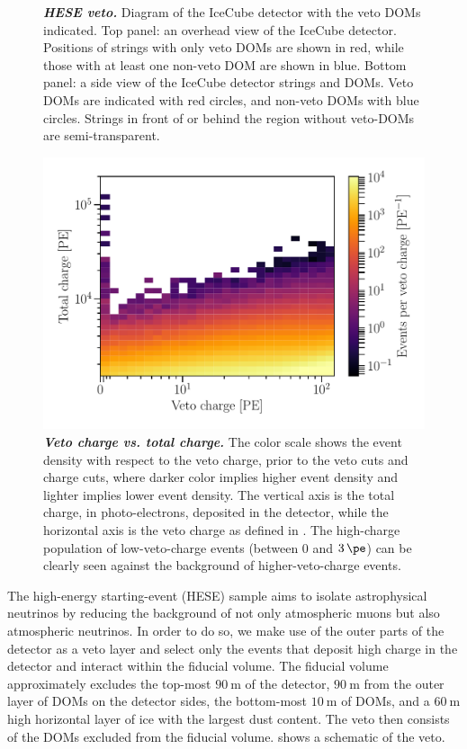 \begin{figure}
	\internallinenumbers
	\caption{\textbf{\textit{HESE veto.}} Diagram of the IceCube detector with the veto DOMs indicated.
		Top panel: an overhead view of the IceCube detector.
		Positions of strings with only veto DOMs are shown in red, while those with at least one non-veto DOM are shown in blue.
		Bottom panel: a side view of the IceCube detector strings and DOMs.
		Veto DOMs are indicated with red circles, and non-veto DOMs with blue circles.
		Strings in front of or behind the region without veto-DOMs are semi-transparent.}\label{fig:veto}
\end{figure}

\begin{figure}
	\centering
	\includegraphics[width=\linewidth]{figures/hese_paper/veto_charge_plot}
	\internallinenumbers
	\caption{\textbf{\textit{Veto charge vs. total charge.}} The color scale shows the event density with respect to the veto charge, prior to the veto cuts and charge cuts, where darker color implies higher event density and lighter implies lower event density.
		The vertical axis is the total charge, in photo-electrons, deposited in the detector, while the horizontal axis is the veto charge as defined in .
		The high-charge population of low-veto-charge events (between 0 and $\SI{3}\pe$) can be clearly seen against the background of higher-veto-charge events.}\label{fig:charge_veto}
\end{figure}

The high-energy starting-event (HESE) sample aims to isolate astrophysical neutrinos by reducing the background of not only atmospheric muons but also atmospheric neutrinos.
In order to do so, we make use of the outer parts of the detector as a veto layer and select only the events that deposit high charge in the detector and interact within the fiducial volume.
The fiducial volume approximately excludes the top-most $\SI{90}\meter$ of the detector, $\SI{90}\meter$ from the outer layer of DOMs on the detector sides, the bottom-most $\SI{10}\meter$ of DOMs, and a $\SI{60}\meter$ high horizontal layer of ice with the largest dust content.
The veto then consists of the DOMs excluded from the fiducial volume.
 shows a schematic of the veto.

